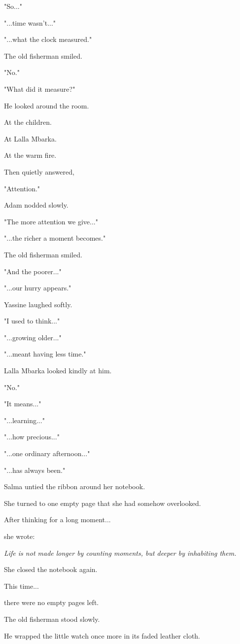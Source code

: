 \documentclass[12pt,openany]{book}
\begin{document}
"So..."

"...time wasn't..."

"...what the clock measured."

The old fisherman smiled.

"No."

"What did it measure?"

He looked around the room.

At the children.

At Lalla Mbarka.

At the warm fire.

Then quietly answered,

"Attention."

Adam nodded slowly.

"The more attention we give..."

"...the richer a moment becomes."

The old fisherman smiled.

"And the poorer..."

"...our hurry appears."

Yassine laughed softly.

"I used to think..."

"...growing older..."

"...meant having less time."

Lalla Mbarka looked kindly at him.

"No."

"It means..."

"...learning..."

"...how precious..."

"...one ordinary afternoon..."

"...has always been."

Salma untied the ribbon around her notebook.

She turned to one empty page that she had somehow overlooked.

After thinking for a long moment...

she wrote:

\emph{Life is not made longer by counting moments, but deeper by inhabiting them.}

She closed the notebook again.

This time...

there were no empty pages left.

The old fisherman stood slowly.

He wrapped the little watch once more in its faded leather cloth.
\end{document}
